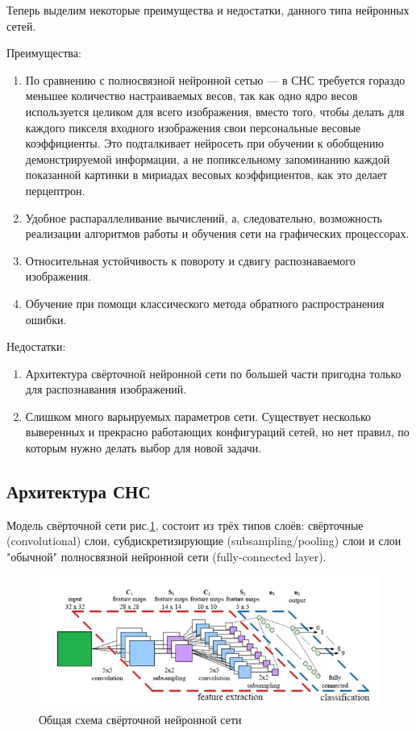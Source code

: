 \documentclass[14pt]{article}
\numberwithin{figure}{section}
\numberwithin{equation}{section}
\begin{document}
Теперь выделим некоторые преимущества и недостатки, данного типа нейронных сетей.

Преимущества:
\begin{enumerate}
	\item
	По сравнению с полносвязной нейронной сетью — в СНС требуется гораздо меньшее количество настраиваемых весов, так как одно ядро весов используется целиком для всего изображения, вместо того, чтобы делать для каждого пикселя входного изображения свои персональные весовые коэффициенты. Это подталкивает нейросеть при обучении к обобщению демонстрируемой информации, а не попиксельному запоминанию каждой показанной картинки в мириадах весовых коэффициентов, как это делает перцептрон.
	\item
	Удобное распараллеливание вычислений, а, следовательно, возможность реализации алгоритмов работы и обучения сети на графических процессорах.
	\item
	Относительная устойчивость к повороту и сдвигу распознаваемого изображения.
	\item
	Обучение при помощи классического метода обратного распространения ошибки.
\end{enumerate}

Недостатки:
\begin{enumerate}
	\item
	Архитектура свёрточной нейронной сети по большей части пригодна только для распознавания изображений.
	\item
	Слишком много варьируемых параметров сети. Существует несколько выверенных и прекрасно работающих конфигураций сетей, но нет правил, по которым нужно делать выбор для новой задачи.
\end{enumerate}

\subsection{Архитектура СНС}

Модель свёрточной сети рис.\ref{ris:6}, состоит из трёх типов слоёв: свёрточные \\ (convolutional) слои, субдискретизирующие (subsampling/pooling) слои и слои "обычной" полносвязной нейронной сети (fully-connected layer).

\begin{figure}[h]
	\begin{center}
		\includegraphics[scale=0.99] {6.JPG}
		\caption{Общая схема свёрточной нейронной сети}
		\label{ris:6}
	\end{center}
\end{figure}
\end{document}
